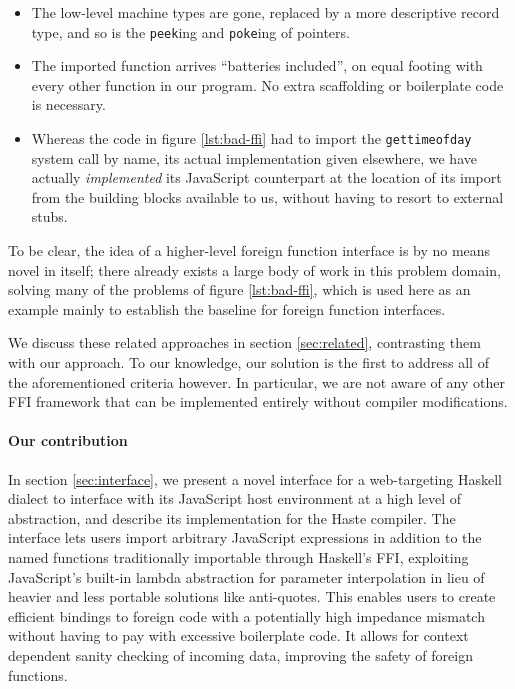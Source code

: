 \documentclass{sigplanconf}
\begin{document}
\begin{itemize}
\item
  The low-level machine types are gone, replaced by a more descriptive record
  type, and so is the \lstinline!peek!ing and \lstinline!poke!ing of pointers.
\item
  The imported function arrives ``batteries included'', on equal footing with
  every other function in our program. No extra scaffolding or boilerplate
  code is necessary.
\item
  Whereas the code in figure \ref{lst:bad-ffi} had to import the
  \lstinline!gettimeofday! system call by name, its actual implementation
  given elsewhere, we have actually \emph{implemented} its JavaScript
  counterpart at the location of its import from the building blocks
  available to us, without having to resort to external stubs.
\end{itemize}

To be clear, the idea of a higher-level foreign function interface is by no
means novel in itself;
there already exists a large body of work in this problem domain, solving many
of the problems of figure \ref{lst:bad-ffi},
which is used here as an example mainly to
establish the baseline for foreign function interfaces.

We discuss these related approaches in section \ref{sec:related}, contrasting
them with our approach. To our knowledge, our solution is the first to address
all of the aforementioned criteria however.
In particular, we are not aware of any other FFI framework that can be
implemented entirely without compiler modifications.

\paragraph{Our contribution}\label{sec:contrib}
In section \ref{sec:interface}, we present a novel interface for a web-targeting
Haskell dialect to interface with its JavaScript host environment at a high level of
abstraction, and describe its implementation for the Haste compiler.
The interface lets users import arbitrary JavaScript expressions in addition
to the named functions traditionally importable through Haskell's FFI, exploiting
JavaScript's built-in lambda\newline
abstraction for parameter interpolation in lieu of
heavier and less portable solutions like anti-quotes.
This enables users to create efficient bindings to foreign code with a potentially
high impedance mismatch without having to pay with excessive boilerplate code.
It allows for context dependent sanity checking of incoming data,
improving the safety of foreign functions.
\end{document}
